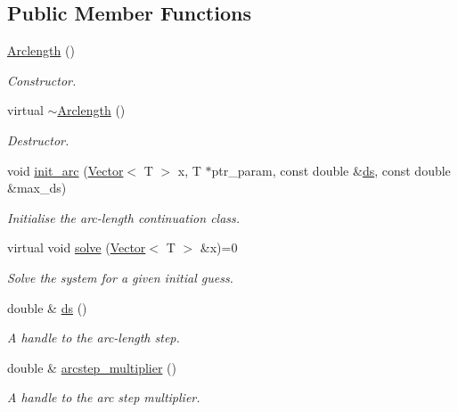 \subsection*{Public Member Functions}
\begin{DoxyCompactItemize}
\item 
\hyperlink{classLuna_1_1Arclength_afa2eac838a1005897d0f82815764237f}{Arclength} ()
\begin{DoxyCompactList}\small\item\em Constructor. \end{DoxyCompactList}\item 
virtual \hyperlink{classLuna_1_1Arclength_acd49e172150ec06785b68bf84a9e818e}{$\sim$\+Arclength} ()
\begin{DoxyCompactList}\small\item\em Destructor. \end{DoxyCompactList}\item 
void \hyperlink{classLuna_1_1Arclength_a37c85555280cd6fbcf4acc72c92c5f41}{init\+\_\+arc} (\hyperlink{classLuna_1_1Vector}{Vector}$<$ T $>$ x, T $\ast$ptr\+\_\+param, const double \&\hyperlink{classLuna_1_1Arclength_af92962a44295884704ebc6196ffbd6f6}{ds}, const double \&max\+\_\+ds)
\begin{DoxyCompactList}\small\item\em Initialise the arc-\/length continuation class. \end{DoxyCompactList}\item 
virtual void \hyperlink{classLuna_1_1Arclength_a0829d51bb49011f5ed56c25b7554d115}{solve} (\hyperlink{classLuna_1_1Vector}{Vector}$<$ T $>$ \&x)=0
\begin{DoxyCompactList}\small\item\em Solve the system for a given initial guess. \end{DoxyCompactList}\item 
double \& \hyperlink{classLuna_1_1Arclength_af92962a44295884704ebc6196ffbd6f6}{ds} ()
\begin{DoxyCompactList}\small\item\em A handle to the arc-\/length step. \end{DoxyCompactList}\item 
double \& \hyperlink{classLuna_1_1Arclength_a2c080f19e24df1cd4e146bd79a88b6c7}{arcstep\+\_\+multiplier} ()
\begin{DoxyCompactList}\small\item\em A handle to the arc step multiplier. \end{DoxyCompactList}\item 

\end{DoxyCompactItemize}
